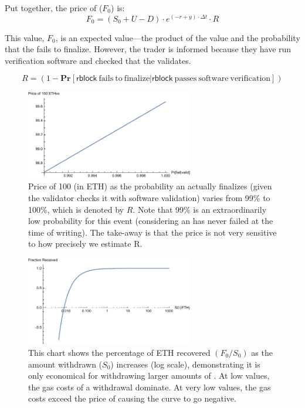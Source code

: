 Put together, the price of \ethxx ($F_0$) is: \[ F_0 = (S_0 + U - D)\cdot e^{(-r+y)\cdot\Delta t} \cdot R \]

This value, $F_0$, is an expected value---the product of the value and the probability that the \rblock fails to finalize. However, the trader is informed because they have run verification software and checked that the \rblock validates.


\[ R = (1-\mathbf{Pr}[ \mathrm{\mathsf{rblock}~fails~to~finalize} |  \mathrm{\mathsf{rblock}~passes~software~verification} ]) \]


\begin{figure}[t]
	\centering
	\includegraphics[width=0.65\textwidth]{figures/chart1.pdf}
	\caption{Price of 100 \ethxx (in ETH) as the probability an \rblock actually finalizes (given the validator checks it with software validation) varies from 99\%  to 100\%, which is denoted by $R$. Note that 99\% is an extraordinarily low probability for this event (considering an \rblock has never failed at the time of writing). The take-away is that the price is not very sensitive to how precisely we estimate R.\label{fig:risk}}
\end{figure}

\begin{figure}[t]
	\centering
	\includegraphics[width=0.65\textwidth]{figures/chart2.pdf}
	\caption{This chart shows the percentage of ETH recovered $(F_0/S_0)$ as the amount withdrawn ($S_0$) increases (log scale), demonstrating it is only economical for withdrawing larger amounts of \ethtwo. At low values, the gas costs of a withdrawal dominate. At very low values, the gas costs exceed the price of \ethxx causing the curve to go negative.\label{fig:amount}}
	
\end{figure}

